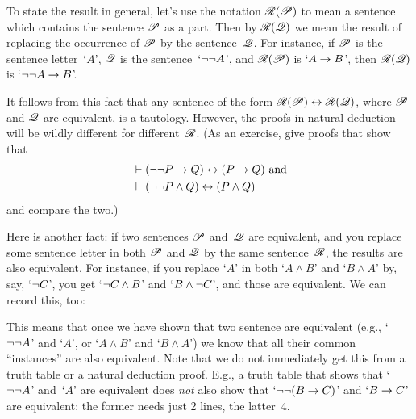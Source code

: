 To state the result in general, let's use the notation $\mathscr{R}(\mathscr{P})$ to mean a sentence which contains the sentence $\mathscr{P}$ as a part. Then by $\mathscr{R}(\mathscr{Q})$ we mean the result of replacing the occurrence of $\mathscr{P}$ by the sentence~$\mathscr{Q}$.  For instance, if $\mathscr{P}$ is the sentence letter~`$A$', $\mathscr{Q}$ is the sentence~`$\neg\neg A$', and $\mathscr{R}(\mathscr{P})$ is `$A \rightarrow B$', then $\mathscr{R}(\mathscr{Q})$ is `$\neg\neg A \rightarrow B$'.


It follows from this fact that any sentence of the form $\mathscr{R}(\mathscr{P}) \leftrightarrow \mathscr{R}(\mathscr{Q})$, where $\mathscr{P}$ and $\mathscr{Q}$ are equivalent, is a tautology. However, the proofs in natural deduction will be wildly different for different~$\mathscr{R}$. (As an exercise, give proofs that show that 
\begin{align*}
	& \vdash (\neg\neg P \rightarrow Q) \leftrightarrow (P \rightarrow Q)  \text{ and}\\
	& \vdash (\neg\neg P \wedge Q) \leftrightarrow (P \wedge Q)
\end{align*}
and compare the two.)

Here is another fact: if two sentences $\mathscr{P}$ and~$\mathscr{Q}$ are equivalent, and you replace some sentence letter in both $\mathscr{P}$ and $\mathscr{Q}$ by the same sentence~$\mathscr{R}$, the results are also equivalent.  For instance, if you replace `$A$' in both `$A \land B$' and `$B \land A$' by, say, `$\neg C$', you get `$\neg C \land B$' and `$B \land \neg C$', and those are equivalent. We can record this, too:


This means that once we have shown that two sentence are equivalent (e.g., `$\neg\neg A$' and `$A$', or `$A \land B$' and `$B \land A$') we know that all their common ``instances'' are also equivalent.  Note that we do not immediately get this from a truth table or a natural deduction proof. E.g., a truth table that shows that `$\neg\neg A$' and~`$A$' are equivalent does \emph{not} also show that `$\neg\neg(B \rightarrow C)$' and `$B \rightarrow C$' are equivalent: the former needs just 2 lines, the latter~4.

